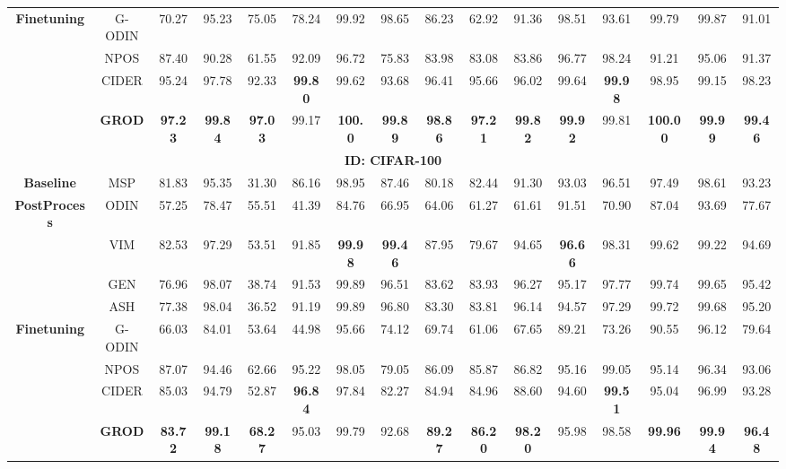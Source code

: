 \documentclass{article}
\theoremstyle{plain}
\theoremstyle{definition}
\theoremstyle{remark}
\begin{document}
\begin{table}[!t]
{\begin{tabular}{cccccccccccccccc}
\textbf{Finetuning} & \textsc{G-ODIN} & 70.27 & 95.23 & 75.05 & 78.24 & 99.92 & 98.65 & 86.23 & 62.92 & 91.36 & 98.51 & 93.61 & 99.79 & 99.87 & 91.01 \\
%
 & \textsc{NPOS} & 87.40 & 90.28 & 61.55 & 92.09 & 96.72 & 75.83 & 83.98 & 83.08 & 83.86 & 96.77 & 98.24 & 91.21 & 95.06 & 91.37 \\
 & \textsc{CIDER} & 95.24 & 97.78 & 92.33 & \textbf{99.80} & 99.62 & 93.68 & 96.41 & 95.66 & 96.02 & 99.64 & \textbf{99.98} & 98.95 & 99.15 & 98.23 \\ 
\rowcolor{gray!10} & \textsc{\textbf{GROD}} & \textbf{97.23} & \textbf{99.84} & \textbf{97.03} & 99.17 & \textbf{100.0} & \textbf{99.89} & \textbf{98.86} & \textbf{97.21} & \textbf{99.82} & \textbf{99.92} & 99.81 & \textbf{100.00} & \textbf{99.99} & \textbf{99.46} \\ \midrule
\multicolumn{16}{c}{\textbf{ID: CIFAR-100}} \\ \midrule
%
\textbf{Baseline} & \textsc{MSP} & 81.83 & 95.35 & 31.30 & 86.16 & 98.95 & 87.46 & 80.18 & 82.44 & 91.30 & 93.03 & 96.51 & 97.49 & 98.61 & 93.23 \\ \midrule
%
\textbf{PostProcess} & \textsc{ODIN} & 57.25 & 78.47 & 55.51 & 41.39 & 84.76 & 66.95 & 64.06 & 61.27 & 61.61 & 91.51 & 70.90 & 87.04 & 93.69 & 77.67 \\
%
 & \textsc{VIM} & 82.53 & 97.29 & 53.51 & 91.85 & \textbf{99.98} & \textbf{99.46} & 87.95 & 79.67 & 94.65 & \textbf{96.66} & 98.31 & 99.62 & 99.22 & 94.69 \\
 & \textsc{GEN} & 76.96 & 98.07 & 38.74 & 91.53 & 99.89 & 96.51 & 83.62 & 83.93 & 96.27 & 95.17 & 97.77 & 99.74 & 99.65 & 95.42 \\
 & \textsc{ASH} & 77.38 & 98.04 & 36.52 & 91.19 & 99.89 & 96.80 & 83.30 & 83.81 & 96.14 & 94.57 & 97.29 & 99.72 & 99.68 & 95.20 \\ \midrule
\textbf{Finetuning} & \textsc{G-ODIN} & 66.03 & 84.01 & 53.64 & 44.98 & 95.66 & 74.12 & 69.74 & 61.06 & 67.65 & 89.21 & 73.26 & 90.55 & 96.12 & 79.64 \\
 & \textsc{NPOS} & 87.07 & 94.46 & 62.66 & 95.22 & 98.05 & 79.05 & 86.09 & 85.87 & 86.82 & 95.16 & 99.05 & 95.14 & 96.34 & 93.06 \\
 & \textsc{CIDER} & 85.03 & 94.79 & 52.87 & \textbf{96.84} & 97.84 & 82.27 & 84.94 & 84.96 & 88.60 & 94.60 & \textbf{99.51} & 95.04 & 96.99 & 93.28 \\ 
\rowcolor{gray!10} & \textsc{\textbf{GROD}} & \textbf{83.72} & \textbf{99.18} & \textbf{68.27} & 95.03 & 99.79 & 92.68 & \textbf{89.27} & \textbf{86.20} & \textbf{98.20} & 95.98 & 98.58 & \textbf{99.96} & \textbf{99.94} & \textbf{96.48} \\ \bottomrule
\end{tabular}
}
\end{table}
\end{document}
